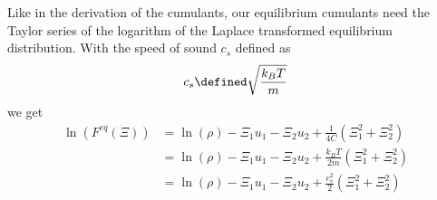 Like in the derivation of the cumulants, our equilibrium cumulants need the Taylor series of the logarithm of the Laplace transformed equilibrium distribution. With the speed of sound $c_s$ defined as
\begin{equation}
  c_s \defined \sqrt{\frac{k_B T}{m}}
\end{equation}
we get
\begin{equation}
  \begin{aligned}
    \ln(F^{eq}(\Xi))
      & = \ln(\rho) - \Xi_1 u_1 - \Xi_2 u_2 + \frac{1}{4C}\left(\Xi_1^2 + \Xi_2^2 \right) \\
      & = \ln(\rho) - \Xi_1 u_1 - \Xi_2 u_2 + \frac{k_B T}{2m}\left(\Xi_1^2 + \Xi_2^2 \right) \\
      & = \ln(\rho) - \Xi_1 u_1 - \Xi_2 u_2 + \frac{c_s^2}{2}\left(\Xi_1^2 + \Xi_2^2 \right)
  \end{aligned}
\end{equation}

